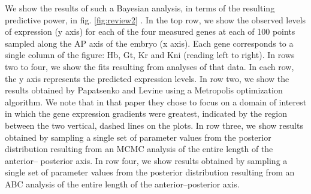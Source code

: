 We show the results of such a Bayesian analysis, in terms of the resulting predictive power, in fig. \ref{fig:review2} . In the top row, we show the observed levels of expression (y axis) for each of the four measured genes at each of 100 points sampled along the AP axis of the embryo (x axis). Each gene corresponds to a single column of the figure: Hb, Gt, Kr and Kni (reading left to right). In rows two to four, we show the fits resulting from analyses of that data. In each row, the y axis represents the predicted expression levels. In row two, we show the results obtained by Papatsenko and Levine using a Metropolis optimization algorithm. We note that in that paper they chose to focus on a domain of interest in which the gene expression gradients were greatest, indicated by the region between the two vertical, dashed lines on the plots. In row three, we show results obtained by sampling a single set of parameter values from the posterior distribution resulting from an MCMC analysis of the entire length of the anterior– posterior axis. In row four, we show results obtained by sampling a single set of parameter values from the posterior distribution resulting from an ABC analysis of the entire length of the anterior–posterior axis.
